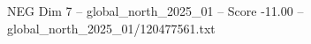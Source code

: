 \begin{textsample}{NEG Dim 7 – global\_north\_2025\_01 – Score -11.00 – global\_north\_2025\_01/120477561.txt}
\end{textsample}
